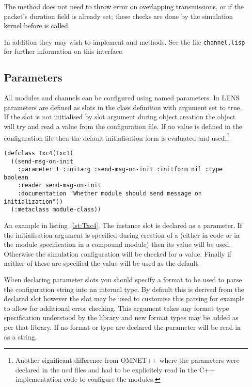 \documentclass[a4paper,11pt,twoside,openany]{report}
\newcommand{\acr}[1]{\acrshort{#1}}
\begin{document}
The method does not need to throw error on overlapping transmissions,
or if the packet's duration field is already set; these checks are
done by the simulation kernel before  is called.

In addition they may wish to implement  and
 methods. See the file {\tt channel.lisp} for further
information on this interface.

\subsection{Parameters}

All modules and channels can be configured using named
parameters. In \acr{LENS} parameters are defined as slots in
the class definition with  argument set to true. If the
slot is not initialised by slot argument during object creation the
object will try and read a value from the configuration file. If no
value is defined in the configuration file then the default
initialisation form is evaluated and used.\footnote{Another significant
  difference from OMNET++ where the parameters were declared in the
  ned files and had to be explicitely read in the C++ implementation
  code to configure the modules.}

\begin{lstlisting}[label={lst:Txc4},caption={Compound module with a parameter}]
(defclass Txc4(Txc1)
  ((send-msg-on-init
    :parameter t :initarg :send-msg-on-init :initform nil :type boolean
    :reader send-msg-on-init
    :documentation "Whether module should send message on initialization"))
  (:metaclass module-class))
\end{lstlisting}

An example in listing~\ref{lst:Txc4}. The 
instance slot is declared as a parameter. If the initialisation
argument  is specified during creation of a
 (either in code or in the module specification in a compound
module) then its value will be used. Otherwise the simulation
configuration will be checked for a value. Finally if neither of these
are specified the  value will be used as the default. 

When declaring parameter slots you should specify a
format to be used to parse the configuration string into an internal
type. By default this is derived from the declared slot 
however the slot  may be used to customise this parsing
for example to allow for additional error checking. This argument
takes any format type specification understood by the
 library and new format types may be added
as per that library. If no format or type are declared the parameter
will be read in as a string.
\end{document}
